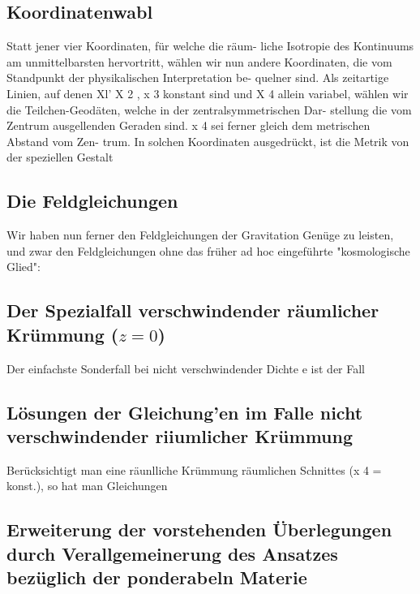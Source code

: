 \subsection{Koordinatenwabl}


Statt jener vier Koordinaten, für welche die räum-
liche Isotropie des Kontinuums am unmittelbarsten
hervortritt, wählen wir nun andere Koordinaten, die
vom Standpunkt der physikalischen Interpretation be-
quelner sind.
Als zeitartige Linien, auf denen Xl' X 2 , x 3 konstant
sind und X 4 allein variabel, wählen wir die Teilchen-Geodäten, welche in der zentralsymmetrischen Dar-
stellung die vom Zentrum ausgellenden Geraden sind.
x 4 sei ferner gleich dem metrischen Abstand vom Zen-
trum. In solchen Koordinaten ausgedrückt, ist die
Metrik von der speziellen Gestalt

\subsection{Die Feldgleichungen}


Wir haben nun ferner den Feldgleichungen der Gravitation Genüge zu leisten, und zwar den Feldgleichungen ohne das früher ad hoc eingeführte "kosmologische Glied":

\subsection{Der Spezialfall verschwindender räumlicher Krümmung ($z = 0$)}


Der einfachste Sonderfall bei nicht verschwindender Dichte e ist der Fall

\subsection{Lösungen der Gleichung'en im Falle nicht verschwindender riiumlicher Krümmung}


Berücksichtigt man eine räunlliche Krümmung räumlichen Schnittes (x 4 = konst.), so hat man Gleichungen

\subsection{Erweiterung der vorstehenden Überlegungen durch Verallgemeinerung des Ansatzes bezüglich der ponderabeln  Materie}

